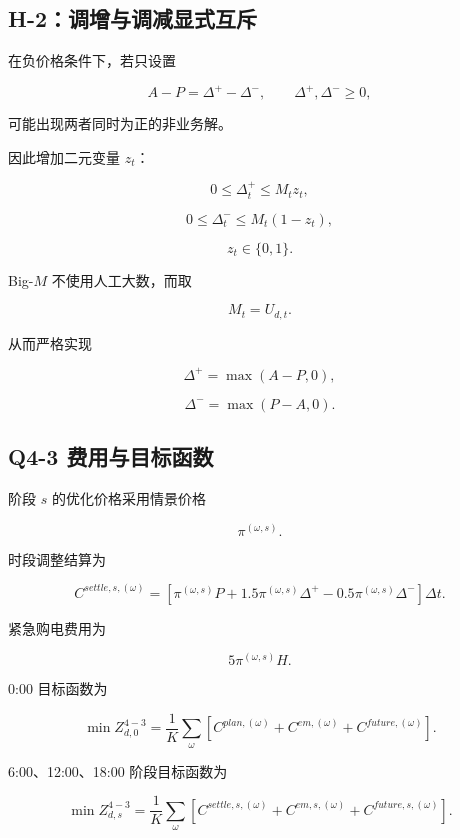 \subsection{H-2：调增与调减显式互斥}

在负价格条件下，若只设置

\[
A-P=\Delta^+-\Delta^-,
\qquad
\Delta^+,\Delta^-\ge0,
\]

可能出现两者同时为正的非业务解。

因此增加二元变量 \(z_t\)：

\[
0\le\Delta_t^+\le M_tz_t,
\]

\[
0\le\Delta_t^-\le M_t(1-z_t),
\]

\begin{equation}
z_t\in\{0,1\}.
\end{equation}

Big-\(M\) 不使用人工大数，而取

\begin{equation}
M_t=U_{d,t}.
\end{equation}

从而严格实现

\[
\Delta^+
=
\max(A-P,0),
\]

\[
\Delta^-
=
\max(P-A,0).
\]

\subsection{Q4-3 费用与目标函数}

阶段 \(s\) 的优化价格采用情景价格

\[
\pi^{(\omega,s)}.
\]

时段调整结算为

\begin{equation}
C^{settle,s,(\omega)}
=
\left[
\pi^{(\omega,s)}P
+
1.5\pi^{(\omega,s)}\Delta^+
-
0.5\pi^{(\omega,s)}\Delta^-
\right]\Delta t.
\end{equation}

紧急购电费用为

\[
5\pi^{(\omega,s)}H.
\]

0:00 目标函数为

\begin{equation}
\min Z_{d,0}^{4-3}
=
\frac1K
\sum_\omega
\left[
C^{plan,(\omega)}
+
C^{em,(\omega)}
+
C^{future,(\omega)}
\right].
\end{equation}

6:00、12:00、18:00 阶段目标函数为

\begin{equation}
\min Z_{d,s}^{4-3}
=
\frac1K
\sum_\omega
\left[
C^{settle,s,(\omega)}
+
C^{em,s,(\omega)}
+
C^{future,s,(\omega)}
\right].
\end{equation}

